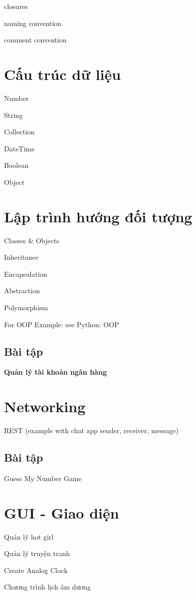 closures

naming convention

comment convention

\section{Cấu trúc dữ liệu}

Number

String

Collection

DateTime

Boolean

Object

\section{Lập trình hướng đối tượng}

Classes & Objects

Inheritance

Encapsulation

Abstraction

Polymorphism

For OOP Example: see Python: OOP

\subsection{Bài tập}

\textbf{Quản lý tài khoản ngân hàng}

\section{Networking}

REST (example with chat app sender, receiver, message)

\subsection{Bài tập}

Guess My Number Game

\section{GUI - Giao diện}

Quản lý hot girl

Quản lý truyện tranh

Create Analog Clock

Chương trình lịch âm dương

